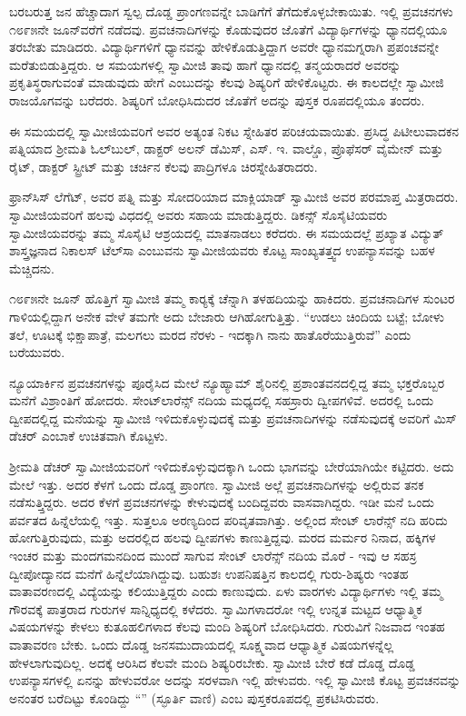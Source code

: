  ಬರಬರುತ್ತ ಜನ ಹೆಚ್ಚಾದಾಗ ಸ್ವಲ್ಪ ದೊಡ್ಡ ಪ್ರಾಂಗಣವನ್ನೇ ಬಾಡಿಗೆಗೆ ತೆಗೆದುಕೊಳ್ಳಬೇಕಾಯಿತು. ಇಲ್ಲಿ ಪ್ರವಚನಗಳು ೧೮೯೫ನೇ ಜೂನ್‍ವರೆಗೆ ನಡೆದವು. ಪ್ರವಚನಾದಿಗಳನ್ನು ಕೊಡುವುದರ ಜೊತೆಗೆ ವಿದ್ಯಾರ್ಥಿಗಳನ್ನು ಧ್ಯಾನದಲ್ಲಿಯೂ ತರಬೇತು ಮಾಡಿದರು. ವಿದ್ಯಾರ್ಥಿಗಳಿಗೆ ಧ್ಯಾನವನ್ನು ಹೇಳಿಕೊಡುತ್ತಿದ್ದಾಗ ಅವರೇ ಧ್ಯಾನಮಗ್ನರಾಗಿ ಪ್ರಪಂಚವನ್ನೇ ಮರೆತುಬಿಡುತ್ತಿದ್ದರು. ಆ ಸಮಯಗಳಲ್ಲಿ ಸ್ವಾಮೀಜಿ ತಾವು ಹಾಗೆ ಧ್ಯಾನದಲ್ಲಿ ತನ್ಮಯರಾದರೆ ಅವರನ್ನು ಪ್ರಕೃತಿಸ್ಥರಾಗುವಂತೆ ಮಾಡುವುದು ಹೇಗೆ ಎಂಬುದನ್ನು ಕೆಲವು ಶಿಷ್ಯರಿಗೆ ಹೇಳಿಕೊಟ್ಟರು. ಈ ಕಾಲದಲ್ಲೇ ಸ್ವಾಮೀಜಿ ರಾಜಯೊಗವನ್ನು ಬರೆದರು. ಶಿಷ್ಯರಿಗೆ ಬೋಧಿಸಿದುದರ ಜೊತೆಗೆ ಅದನ್ನು ಪುಸ್ತಕ ರೂಪದಲ್ಲಿಯೂ ತಂದರು. 

 ಈ ಸಮಯದಲ್ಲಿ ಸ್ವಾಮೀಜಿಯವರಿಗೆ ಅವರ ಅತ್ಯಂತ ನಿಕಟ ಸ್ನೇಹಿತರ ಪರಿಚಯವಾಯಿತು. ಪ್ರಸಿದ್ಧ ಪಿಟೀಲುವಾದಕನ ಪತ್ನಿಯಾದ ಶ‍್ರೀಮತಿ ಓಲ್‍ಬುಲ್, ಡಾಕ್ಟರ್ ಅಲನ್ ಡೆಮಿಸ್, ಎಸ್. ಇ. ವಾಲ್ಡೊ, ಪ್ರೊಫೆಸರ್ ವೈಮೇನ್ ಮತ್ತು ರೈಟ್, ಡಾಕ್ಟರ್ ಸ್ಟ್ರೀಟ್ ಮತ್ತು ಚರ್ಚಿನ ಕೆಲವು ಪಾದ್ರಿಗಳೂ ಚಿರಸ್ನೇಹಿತರಾದರು. 

 ಫ್ರಾನ್‍ಸಿಸ್ ಲೆಗೆಟ್, ಅವರ ಪತ್ನಿ ಮತ್ತು ಸೋದರಿಯಾದ ಮಾಕ್ಲಿಯಾಡ್ ಸ್ವಾಮೀಜಿ ಅವರ ಪರಮಾಪ್ತ ಮಿತ್ರರಾದರು. ಸ್ವಾಮೀಜಿಯವರಿಗೆ ಹಲವು ವಿಧದಲ್ಲಿ ಅವರು ಸಹಾಯ ಮಾಡುತ್ತಿದ್ದರು. ಡಿಕನ್ಸ್ ಸೊಸೈಟಿಯವರು ಸ್ವಾಮೀಜಿಯವರನ್ನು ತಮ್ಮ ಸೊಸೈಟಿ ಆಶ್ರಯದಲ್ಲಿ ಮಾತನಾಡಲು ಕರೆದರು. ಈ ಸಮಯದಲ್ಲೆ ಪ್ರಖ್ಯಾತ ವಿದ್ಯುತ್ ಶಾಸ್ತ್ರಜ್ಞನಾದ ನಿಕಾಲಸ್ ಟೆಲ್‍ಸಾ ಎಂಬುವನು ಸ್ವಾಮೀಜಿಯವರು ಕೊಟ್ಟ ಸಾಂಖ್ಯತತ್ತ್ವದ ಉಪನ್ಯಾಸವನ್ನು ಬಹಳ ಮೆಚ್ಚಿದನು. 

 ೧೮೯೫ನೇ ಜೂನ್ ಹೊತ್ತಿಗೆ ಸ್ವಾಮೀಜಿ ತಮ್ಮ ಕಾರ‍್ಯಕ್ಕೆ ಚೆನ್ನಾಗಿ ತಳಹದಿಯನ್ನು ಹಾಕಿದರು. ಪ್ರವಚನಾದಿಗಳ ಸುಂಟರ ಗಾಳಿಯಲ್ಲಿದ್ದಾಗ ಅನೇಕ ವೇಳೆ ತಮಗೇ ಅದು ಬೇಜಾರು ಆಗಿಹೋಗುತ್ತಿತ್ತು. “ಉಡಲು ಚಿಂದಿಯ ಬಟ್ಟೆ; ಬೋಳು ತಲೆ, ಊಟಕ್ಕೆ ಭಿಕ್ಷಾಪಾತ್ರೆ, ಮಲಗಲು ಮರದ ನೆರಳು - ಇದಕ್ಕಾಗಿ ನಾನು ಹಾತೊರೆಯುತ್ತಿರುವೆ” ಎಂದು ಬರೆಯುವರು. 

 ನ್ಯೂಯಾರ್ಕಿನ ಪ್ರವಚನಗಳನ್ನು ಪೂರೈಸಿದ ಮೇಲೆ ನ್ಯೂಹ್ಯಾಮ್ ಶೈರಿನಲ್ಲಿ ಪ್ರಶಾಂತವನದಲ್ಲಿದ್ದ ತಮ್ಮ ಭಕ್ತರೊಬ್ಬರ ಮನೆಗೆ ವಿಶ್ರಾಂತಿಗೆ ಹೋದರು. ಸೇಂಟ್‍ಲಾರೆನ್ಸ್ ನದಿಯ ಮಧ್ಯದಲ್ಲಿ ಸಹಸ್ರಾರು ದ್ವೀಪಗಳಿವೆ. ಅದರಲ್ಲಿ ಒಂದು ದ್ವೀಪದಲ್ಲಿದ್ದ ಮನೆಯನ್ನು ಸ್ವಾಮೀಜಿ ಇಳಿದುಕೊಳ್ಳುವುದಕ್ಕೆ ಮತ್ತು ಪ್ರವಚನಾದಿಗಳನ್ನು ನಡೆಸುವುದಕ್ಕೆ ಅವರಿಗೆ ಮಿಸ್ ಡೆಚರ್ ಎಂಬಾಕೆ ಉಚಿತವಾಗಿ ಕೊಟ್ಟಳು. 

 ಶ‍್ರೀಮತಿ ಡೆಚರ್ ಸ್ವಾಮೀಜಿಯವರಿಗೆ ಇಳಿದುಕೊಳ್ಳುವುದಕ್ಕಾಗಿ ಒಂದು ಭಾಗವನ್ನು ಬೇರೆಯಾಗಿಯೇ ಕಟ್ಟಿದರು. ಅದು ಮೇಲೆ ಇತ್ತು. ಅದರ ಕೆಳಗೆ ಒಂದು ದೊಡ್ಡ ಪ್ರಾಂಗಣ. ಸ್ವಾಮೀಜಿ ಅಲ್ಲೆ ಪ್ರವಚನಾದಿಗಳನ್ನು ಅಲ್ಲಿರುವ ತನಕ ನಡೆಸುತ್ತ್ತಿದ್ದರು. ಅದರ ಕೆಳಗೆ ಪ್ರವಚನಗಳನ್ನು ಕೇಳುವುದಕ್ಕೆ ಬಂದಿದ್ದವರು ವಾಸವಾಗಿದ್ದರು. ಇಡೀ ಮನೆ ಒಂದು ಪರ್ವತದ ಹಿನ್ನೆಲೆಯಲ್ಲಿ ಇತ್ತು. ಸುತ್ತಲೂ ಅರಣ್ಯದಿಂದ ಪರಿವೃತವಾಗಿತ್ತು. ಅಲ್ಲಿಂದ ಸೇಂಟ್ ಲಾರೆನ್ಸ್ ನದಿ ಹರಿದು ಹೋಗುತ್ತಿರುವುದು, ಮತ್ತು ಅದರಲ್ಲಿದ ಹಲವು ದ್ವೀಪಗಳು ಕಾಣುತ್ತಿದ್ದವು. ಮರದ ಮರ್ಮರ ನಿನಾದ, ಹಕ್ಕಿಗಳ ಇಂಚರ ಮತ್ತು ಮಂದಗಮನದಿಂದ ಮುಂದೆ ಸಾಗುವ ಸೇಂಟ್ ಲಾರೆನ್ಸ್ ನದಿಯ ಮೊರೆ - ಇವು ಆ ಸಹಸ್ರ ದ್ವೀಪೋದ್ಯಾನದ ಮನೆಗೆ ಹಿನ್ನೆಲೆಯಾಗಿದ್ದುವು. ಬಹುಶಃ ಉಪನಿಷತ್ತಿನ ಕಾಲದಲ್ಲಿ ಗುರು-ಶಿಷ್ಯರು ಇಂತಹ ವಾತಾವರಣದಲ್ಲಿ ವಿದ್ಯೆಯನ್ನು ಕಲಿಯುತ್ತಿದ್ದರು ಎಂದು ಕಾಣುವುದು. ಏಳು ವಾರಗಳು ವಿದ್ಯಾರ್ಥಿಗಳು ಇಲ್ಲಿ ತಮ್ಮ ಗೌರವಕ್ಕೆ ಪಾತ್ರರಾದ ಗುರುಗಳ ಸಾನ್ನಿಧ್ಯದಲ್ಲಿ ಕಳೆದರು. ಸ್ವಾಮಿಗಳಾದರೋ ಇಲ್ಲಿ ಉನ್ನತ ಮಟ್ಟದ ಆಧ್ಯಾತ್ಮಿಕ ವಿಷಯಗಳನ್ನು ಕೇಳಲು ಕುತೂಹಲಿಗಳಾದ ಕೆಲವು ಮಂದಿ ಶಿಷ್ಯರಿಗೆ ಬೋಧಿಸಿದರು. ಗುರುವಿಗೆ ನಿಜವಾದ ಇಂತಹ ವಾತಾವರಣ ಬೇಕು. ಒಂದು ದೊಡ್ಡ ಜನಸಮುದಾಯದಲ್ಲಿ ಸೂಕ್ಷ್ಮವಾದ ಆಧ್ಯಾತ್ಮಿಕ ವಿಷಯಗಳನ್ನೆಲ್ಲ ಹೇಳಲಾಗುವುದಿಲ್ಲ. ಅದಕ್ಕೆ ಆರಿಸಿದ ಕೆಲವೇ ಮಂದಿ ಶಿಷ್ಯರಿರಬೇಕು. ಸ್ವಾಮೀಜಿ ಬೇರೆ ಕಡೆ ದೊಡ್ಡ ದೊಡ್ಡ ಉಪನ್ಯಾಸಗಳಲ್ಲಿ ಏನನ್ನು ಹೇಳುವರೋ ಅದನ್ನು ಸರಳವಾಗಿ ಇಲ್ಲಿ ಹೇಳುವರು. ಇಲ್ಲಿ ಸ್ವಾಮೀಜಿ ಕೊಟ್ಟ ಪ್ರವಚನವನ್ನು ಅನಂತರ ಬರೆದಿಟ್ಟು ಕೊಂಡಿದ್ದು “” (ಸ್ಫೂರ್ತಿ ವಾಣಿ) ಎಂಬ ಪುಸ್ತಕರೂಪದಲ್ಲಿ ಪ್ರಕಟಿಸಿರುವರು. 


